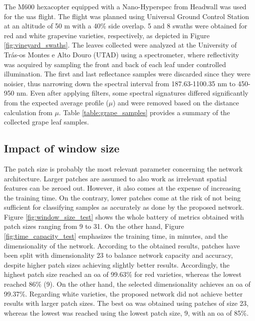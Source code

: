 The M600 hexacopter equipped with a Nano-Hyperspec from Headwall was used for the \acrshort{uas} flight. The flight was planned using Universal Ground Control Station at an altitude of 50 \si{\meter} with a 40\% side overlap. 5 and 8 swaths were obtained for red and white grapevine varieties, respectively, as depicted in Figure \ref{fig:vineyard_swaths}. The leaves collected were analyzed at the University of Trás-os Montes e Alto Douro (UTAD) using a spectrometer, where reflectivity was acquired by sampling the front and back of each leaf under controlled illumination. The first and last reflectance samples were discarded since they were noisier, thus narrowing down the spectral interval from 187.63-1100.35 \si{\nano\meter} to 450-950 \si{\nano\meter}. Even after applying filters, some spectral signatures differed significantly from the expected average profile ($\mu$) and were removed based on the distance calculation from $\mu$. Table \ref{table:grape_samples} provides a summary of the collected grape leaf samples.

\subsection{Impact of window size}

The patch size is probably the most relevant parameter concerning the network architecture. Larger patches are assumed to also work as irrelevant spatial features can be zeroed out. However, it also comes at the expense of increasing the training time. On the contrary, lower patches come at the risk of not being sufficient for classifying samples as accurately as done by the proposed network. Figure \ref{fig:window_size_test} shows the whole battery of metrics obtained with patch sizes ranging from 9 to 31. On the other hand, Figure \ref{fig:time_capacity_test} emphasizes the training time, in minutes, and the dimensionality of the network. According to the obtained results, patches have been split with dimensionality 23 to balance network capacity and accuracy, despite higher patch sizes achieving slightly better results. Accordingly, the highest patch size reached an \acrshort{oa} of 99.63\% for red varieties, whereas the lowest reached 86\% (9). On the other hand, the selected dimensionality achieves an \acrshort{oa} of 99.37\%. Regarding white varieties, the proposed network did not achieve better results with larger patch sizes. The best \acrshort{oa} was obtained using patches of size 23, whereas the lowest was reached using the lowest patch size, 9, with an \acrshort{oa} of 85\%.

